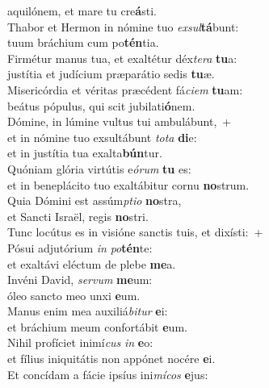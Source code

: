 \evenverse aquilónem, et mare tu cre\textbf{á}sti.\\
\oddverse Thabor et Hermon in nómine tuo \textit{ex}\textit{sul}\textbf{tá}bunt:~\*\\
\oddverse tuum bráchium cum po\textbf{tén}tia.\\
\evenverse Firmétur manus tua, et exaltétur déx\textit{te}\textit{ra} \textbf{tu}a:~\*\\
\evenverse justítia et judícium præparátio sedis \textbf{tu}æ.\\
\oddverse Misericórdia et véritas præcédent fá\textit{ci}\textit{em} \textbf{tu}am:~\*\\
\oddverse beátus pópulus, qui scit jubilati\textbf{ó}nem.\\
\evenverse Dómine, in lúmine vultus tui ambulábunt,~+\\
\evenverse  et in nómine tuo exsultábunt \textit{to}\textit{ta} \textbf{di}e:~\*\\
\evenverse et in justítia tua exalta\textbf{bún}tur.\\
\oddverse Quóniam glória virtútis e\textit{ó}\textit{rum} \textbf{tu} es:~\*\\
\oddverse et in beneplácito tuo exaltábitur cornu \textbf{no}strum.\\
\evenverse Quia Dómini est assúm\textit{pti}\textit{o} \textbf{no}stra,~\*\\
\evenverse et Sancti Israël, regis \textbf{no}stri.\\
\oddverse Tunc locútus es in visióne sanctis tuis, et dixísti:~+\\
\oddverse  Pósui adjutórium \textit{in} \textit{po}\textbf{tén}te:~\*\\
\oddverse et exaltávi eléctum de plebe \textbf{me}a.\\
\evenverse Invéni David, \textit{ser}\textit{vum} \textbf{me}um:~\*\\
\evenverse óleo sancto meo unxi \textbf{e}um.\\
\oddverse Manus enim mea auxiliá\textit{bi}\textit{tur} \textbf{e}i:~\*\\
\oddverse et bráchium meum confortábit \textbf{e}um.\\
\evenverse Nihil profíciet inimí\textit{cus} \textit{in} \textbf{e}o:~\*\\
\evenverse et fílius iniquitátis non appónet nocére \textbf{e}i.\\
\oddverse Et concídam a fácie ipsíus ini\textit{mí}\textit{cos} \textbf{e}jus:~\*\\
